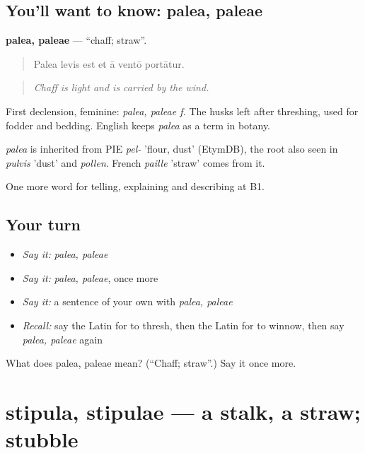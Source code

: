 \subsection*{You'll want to know: palea, paleae}
\textbf{palea, paleae} — \textquotedblleft{}chaff; straw\textquotedblright{}.

\begin{quote}
Palea levis est et ā ventō portātur.
\end{quote}

\begin{quote}
\emph{Chaff is light and is carried by the wind.}
\end{quote}

First declension, feminine: \emph{palea, paleae f.} The husks left after threshing, used for fodder and bedding. English keeps \emph{palea} as a term in botany.

\begin{cousinweb}
\emph{palea} is inherited from PIE \emph{pel-} 'flour, dust' (EtymDB), the root also seen in \emph{pulvis} 'dust' and \emph{pollen}. French \emph{paille} 'straw' comes from it.
\end{cousinweb}

\begin{grammarlens}[title={What you've built}]
One more word for telling, explaining and describing at B1.
\end{grammarlens}

\subsection*{Your turn}
\begin{itemize}
\raggedright
  \item \emph{Say it:} \emph{palea, paleae}
  \item \emph{Say it:} \emph{palea, paleae}, once more
  \item \emph{Say it:} a sentence of your own with \emph{palea, paleae}
  \item \emph{Recall:} say the Latin for to thresh, then the Latin for to winnow, then say \emph{palea, paleae} again
\end{itemize}

\begin{tcolorbox}[breakable,colback=teal!4,colframe=teal!35!black,title={Before you move on}]
What does palea, paleae mean? (\textquotedblleft{}Chaff; straw\textquotedblright{}.) Say it once more.
\end{tcolorbox}
\section[stipula, stipulae]{stipula, stipulae — a stalk, a straw; stubble}


